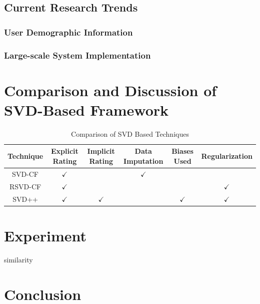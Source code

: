 \documentclass[letter paper, 11pt]{article}
\begin{document}
	
	\subsection{Current Research Trends}
	\subsubsection{User Demographic Information}
	
	
	\subsubsection{Large-scale System Implementation}
	
	\section{Comparison and Discussion of SVD-Based Framework}
	

	\begin{table}
		\centering
		\begin{tabular}{|c|c|c|c|c|c|}
			\hline
			Technique & Explicit Rating & Implicit Rating & Data Imputation & Biases Used & Regularization \\ \hline
			SVD-CF & $\checkmark$ &  & $\checkmark$ &  &  \\ \hline
			RSVD-CF & $\checkmark$ &  & &  & $\checkmark$ \\ \hline
			SVD++ & $\checkmark$ & $\checkmark$ & & $\checkmark$ & $\checkmark$ \\ \hline
		\end{tabular}
		\caption{Comparison of SVD Based Techniques\cite{review}}
		\label{comparison}
	\end{table}
	
	
	\section{Experiment}
	similarity
	
	
	\section{Conclusion}

	
	
\end{document}
